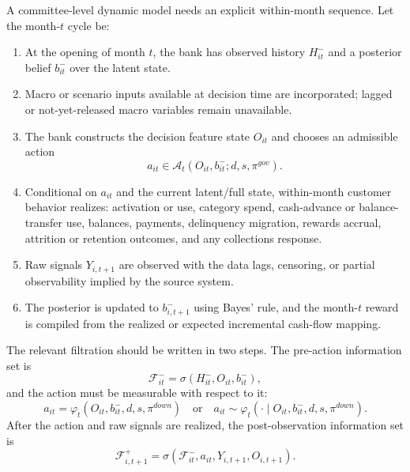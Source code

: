 \documentclass[11pt]{article}
\newcommand{\1}{\mathbf{1}}
\theoremstyle{definition}
\begin{document}
A committee-level dynamic model needs an explicit within-month sequence. Let the
month-$t$ cycle be:
\begin{enumerate}[label=\textbf{T\arabic*.},leftmargin=*]
  \item At the opening of month $t$, the bank has observed history
        $H_{it}^{-}$ and a posterior belief $b_{it}^{-}$ over the latent state.
  \item Macro or scenario inputs available at decision time are incorporated;
        lagged or not-yet-released macro variables remain unavailable.
  \item The bank constructs the decision feature state $O_{it}$ and chooses an
        admissible action
        \[
          a_{it}\in\mathcal{A}_t(O_{it},b_{it}^{-};d,s,\pi^{gov}).
        \]
  \item Conditional on $a_{it}$ and the current latent/full state, within-month
        customer behavior realizes: activation or use, category spend,
        cash-advance or balance-transfer use, balances, payments, delinquency
        migration, rewards accrual, attrition or retention outcomes, and any
        collections response.
  \item Raw signals $Y_{i,t+1}$ are observed with the data lags, censoring, or
        partial observability implied by the source system.
  \item The posterior is updated to $b_{i,t+1}^{-}$ using Bayes' rule, and the
        month-$t$ reward is compiled from the realized or expected incremental
        cash-flow mapping.
\end{enumerate}

The relevant filtration should be written in two steps. The pre-action
information set is
\begin{equation}
  \mathcal{F}^{-}_{it}
  =
  \sigma(H_{it}^{-},O_{it},b_{it}^{-}),
  \label{eq:pre-action-filtration}
\end{equation}
and the action must be measurable with respect to it:
\begin{equation}
  a_{it}=\varphi_t(O_{it},b_{it}^{-},d,s,\pi^{down})
  \quad\text{or}\quad
  a_{it}\sim\varphi_t(\cdot\mid O_{it},b_{it}^{-},d,s,\pi^{down}).
  \label{eq:policy-measurability}
\end{equation}
After the action and raw signals are realized, the post-observation information
set is
\begin{equation}
  \mathcal{F}^{+}_{i,t+1}
  =
  \sigma(\mathcal{F}^{-}_{it},a_{it},Y_{i,t+1},O_{i,t+1}).
  \label{eq:post-action-filtration}
\end{equation}
\end{document}
